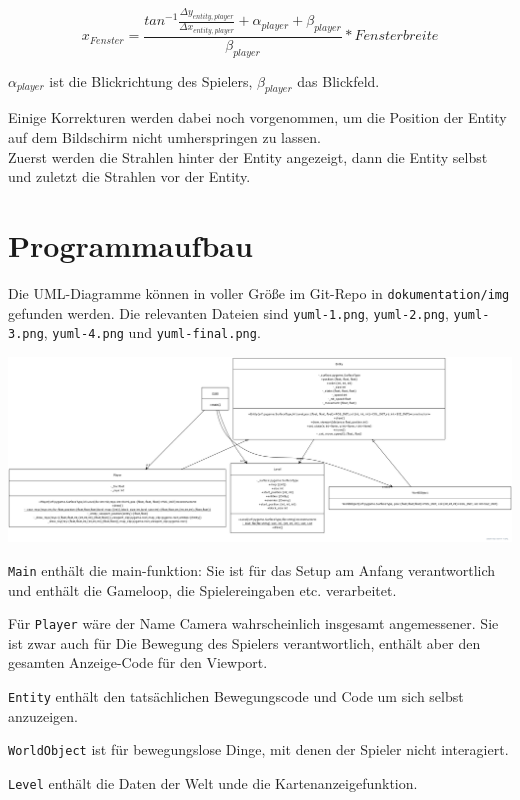 \documentclass[a4paper,titlepage]{article}
\begin{document}
$$
x_{Fenster} = \frac{tan^{-1}{\frac{\Delta y_{entity, player}}{\Delta x_{entity, player}}} + \alpha_{player} + \beta_{player}}{\beta_{player}}*Fensterbreite
$$


$\alpha_{player}$ ist die Blickrichtung des Spielers, $\beta_{player}$ das Blickfeld.

Einige Korrekturen werden dabei noch vorgenommen, um die Position der Entity auf dem Bildschirm nicht umherspringen zu lassen.\\

Zuerst werden die Strahlen hinter der Entity angezeigt, dann die Entity selbst und zuletzt die Strahlen vor der Entity.

\newpage

\section{Programmaufbau}

Die UML-Diagramme können in voller Größe im Git-Repo in \verb|dokumentation/img| gefunden werden. Die relevanten Dateien sind \verb|yuml-1.png|, \verb|yuml-2.png|, \verb|yuml-3.png|, \verb|yuml-4.png| und \verb|yuml-final.png|.
 
\includegraphics[scale=0.15]{./img/yuml-final}

\verb|Main| enthält die main-funktion: Sie ist für das Setup am Anfang verantwortlich und enthält die Gameloop, die Spielereingaben etc. verarbeitet.

Für \verb|Player| wäre der Name Camera wahrscheinlich insgesamt angemessener. Sie ist zwar auch für Die Bewegung des Spielers verantwortlich, enthält aber
den gesamten Anzeige-Code für den Viewport.

\verb|Entity| enthält den tatsächlichen Bewegungscode und Code um sich selbst anzuzeigen.

\verb|WorldObject| ist für bewegungslose Dinge, mit denen der Spieler nicht interagiert.

\verb|Level| enthält die Daten der Welt unde die Kartenanzeigefunktion.
\end{document}
